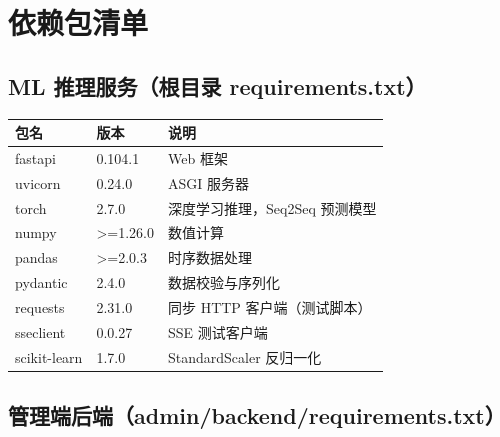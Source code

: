 \documentclass[UTF8,a4paper,11pt]{ctexart}
\begin{document}
\section{依赖包清单}

\subsection{ML 推理服务（根目录 requirements.txt）}

\begin{longtable}{L{3.8cm} L{2.2cm} L{7.0cm}}
\toprule
\textbf{包名} & \textbf{版本} & \textbf{说明} \\
\midrule
\endhead
fastapi            & 0.104.1 & Web 框架 \\
uvicorn            & 0.24.0  & ASGI 服务器 \\
torch              & 2.7.0   & 深度学习推理，Seq2Seq 预测模型 \\
numpy              & >=1.26.0 & 数值计算 \\
pandas             & >=2.0.3  & 时序数据处理 \\
pydantic           & 2.4.0    & 数据校验与序列化 \\
requests           & 2.31.0   & 同步 HTTP 客户端（测试脚本） \\
sseclient          & 0.0.27   & SSE 测试客户端 \\
scikit-learn       & 1.7.0    & StandardScaler 反归一化 \\
\bottomrule
\end{longtable}

\subsection{管理端后端（admin/backend/requirements.txt）}
\end{document}
